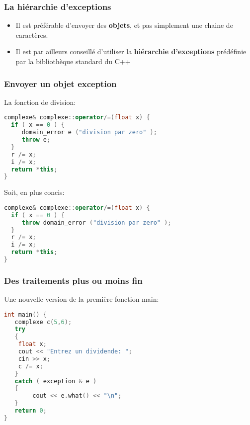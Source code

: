 \documentclass{beamer}
\begin{document}
\begin{frame}[fragile=singleslide,shrink=20]
\frametitle {La hiérarchie d'exceptions}

\begin{itemize}
\item{Il est préférable d'envoyer des \textbf{objets}, et pas simplement une chaine de caractères.}
\item{Il est par ailleurs conseillé d'utiliser la \textbf{hiérarchie d'exceptions} prédéfinie par la bibliothèque standard du C++}
\end{itemize}

\begin{centering}%
%
\par%
\end{centering}%
\end{frame}

\begin{frame}[fragile=singleslide,shrink=20]
\frametitle {Envoyer un objet exception}

La fonction de division:
\begin{lstlisting}[language=c++]
complexe& complexe::operator/=(float x) {
  if ( x == 0 ) {
     domain_error e ("division par zero" );
     throw e;
  }
  r /= x;
  i /= x;
  return *this;
}
\end{lstlisting}

Soit, en plus concis:
\begin{lstlisting}[language=c++]
complexe& complexe::operator/=(float x) {
  if ( x == 0 ) {
     throw domain_error ("division par zero" );
  }
  r /= x;
  i /= x;
  return *this;
}
\end{lstlisting}
\end{frame}

\begin{frame}[fragile=singleslide,shrink=20]
\frametitle {Des traitements plus ou moins fin}

Une nouvelle version de la première fonction main:
\begin{lstlisting}[language=c++]
int main() {
   complexe c(5,6);
   try
   {
   	float x;
   	cout << "Entrez un dividende: ";
	cin >> x;
	c /= x;
   }
   catch ( exception & e ) 
   {
    	cout << e.what() << "\n";
   }
   return 0;
}
\end{lstlisting}
\end{frame}
\end{document}
